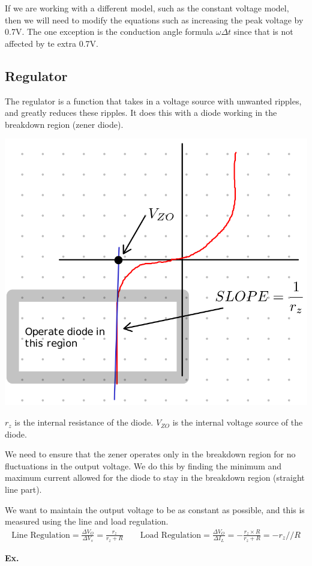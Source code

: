 \documentclass[12pt,letterpaper]{article} \usepackage{amsmath} \usepackage{graphicx} \usepackage[margin=1in]{geometry} \usepackage{longtable}  \usepackage{amssymb}
\begin{document}
	If we are working with a different model, such as the constant voltage model, then we will need to modify the equations such as increasing the peak voltage by 0.7V. The one exception is the conduction angle formula $\omega \Delta t$ since that is not affected by te extra 0.7V.
	
	
	\subsection{Regulator}
	The regulator is a function that takes in a voltage source with unwanted ripples, and greatly reduces these ripples. It does this with a diode working in the breakdown region (zener diode).
	\begin{center}
		\includegraphics[width=0.4\linewidth]{regulator}
	\end{center}
	$r_z$ is the internal resistance of the diode. $V_{ZO}$ is the internal voltage source of the diode. 
	
	We need to ensure that the zener operates only in the breakdown region for no fluctuations in the output voltage. We do this by finding the minimum and maximum current allowed for the diode to stay in the breakdown region (straight line part).
	
	We want to maintain the output voltage to be as constant as possible, and this is measured using the line and load regulation. 
	\begin{align*}
		\text{Line Regulation}=\frac{\Delta V_O}{\Delta V_s} = \frac{r_z}{r_z+R} \qquad \text{Load Regulation}=\frac{\Delta V_O}{\Delta I_L} = -\frac{r_z\times R}{r_z+R} = -r_z // R
	\end{align*}

	\begin{mdframed}[]
	\textbf{Ex. }
	\end{mdframed}
	
	
	
	
	
\end{document}
